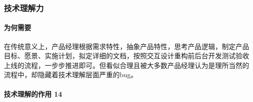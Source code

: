 \documentclass[letterpaper,11pt,english]{sphinxmanual}
\begin{document}
\subsubsection{技术理解力}
\label{\detokenize{chapter_idea/understand_tech:id1}}\label{\detokenize{chapter_idea/understand_tech::doc}}

\paragraph{为何需要}
\label{\detokenize{chapter_idea/understand_tech:id2}}
在传统意义上，产品经理根据需求特性，抽象产品特性，思考产品逻辑，制定产品目标、愿景、实施计划，拟定详细的文档，按照交互\sphinxhyphen{}设计\sphinxhyphen{}重构\sphinxhyphen{}前后台开发\sphinxhyphen{}测试验收上线的流程，一步步推进即可。但看似合理且被大多数产品经理认为是理所当然的流程中，却隐藏着技术理解层面严重的bug。


\paragraph{技术理解的作用 14\sphinxfootnotemark[359]}
\label{\detokenize{chapter_idea/understand_tech:id3}}%
\begin{footnotetext}[359]\sphinxAtStartFootnote
{}
%
\end{footnotetext}\ignorespaces 
\end{document}
